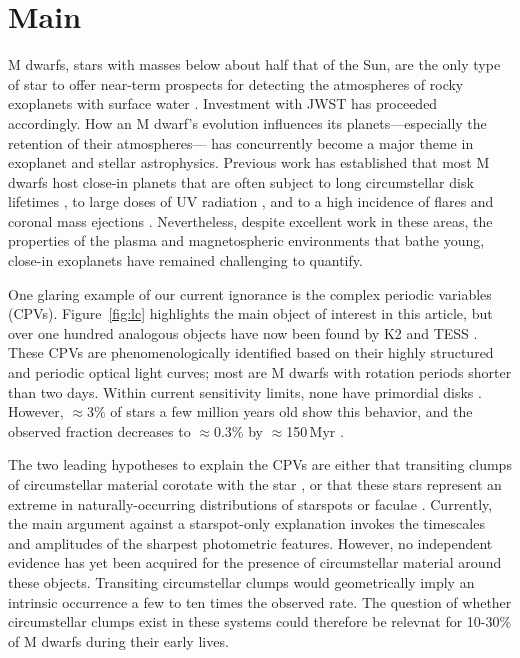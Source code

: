\documentclass{nature3}
\begin{document}

\section{Main}
\label{sec:main}

M dwarfs, stars with masses below about half that of the Sun, are the
only type of star to offer near-term prospects for detecting the
atmospheres of rocky exoplanets with surface water
\cite{NAP26141}.  Investment with JWST has proceeded accordingly.  How
an M dwarf's evolution influences its planets---especially the
retention of their atmospheres--- has concurrently become a major
theme in exoplanet and stellar astrophysics.  Previous work has
established that most M dwarfs host close-in planets
\cite{Dressing2015} that are often subject to long
circumstellar disk lifetimes \cite{Ribas2015}, to large doses of UV
radiation \cite{France2013}, and to a high incidence of flares and
coronal mass ejections \cite{Gunther2020}.  Nevertheless, despite excellent
work in these areas, the properties of the plasma and magnetospheric
environments that bathe young, close-in exoplanets have remained
challenging to quantify.

One glaring example of our current ignorance is the complex periodic
variables (CPVs).  Figure~\ref{fig:lc} highlights the main object of
interest in this article, but over one hundred analogous objects have
now been found by K2 and TESS 
\cite{Rebull2016,Stauffer2017,Rebull2018,Zhan2019,Rebull2020,Bouma2024}.
These CPVs are
phenomenologically identified based on their highly structured and
periodic optical light curves;
most are M dwarfs with rotation periods shorter than two days.
Within current sensitivity limits, none have primordial disks
\cite{Stauffer2017,Bouma2024}.
However, $\approx$3\% of stars a few million years old show this
behavior, and the observed fraction decreases to $\approx$0.3\%
by $\approx$150\,Myr \cite{Rebull2020}.

The two leading hypotheses to explain the CPVs are either that
transiting clumps of circumstellar material corotate with the star
\cite{Stauffer2017,Gunther2022,Bouma2024}, or that these stars
represent an extreme in naturally-occurring distributions of starspots
or faculae \cite{Koen2021}.  Currently, the main argument against a
starspot-only explanation invokes the timescales and amplitudes of the
sharpest photometric features.  However, no independent evidence has
yet been acquired for the presence of circumstellar material around these
objects.  
Transiting circumstellar clumps would geometrically imply an intrinsic
occurrence a few to ten times the observed rate.  The question of
whether circumstellar clumps exist in these systems could therefore be
relevnat for 10-30\% of M dwarfs during their early lives.
\end{document}
